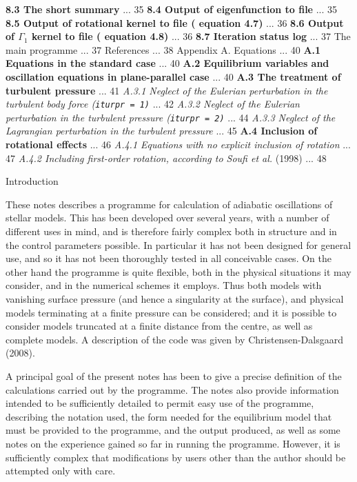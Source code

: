 {\bf 8.3 The short summary} ... 35
\mainsectcont
{\bf 8.4 Output of eigenfunction to file} ... 35
\mainsectcont
{\bf 8.5 Output of rotational kernel to file ({\cf} equation 4.7)} ... 36
\mainsectcont
{\bf 8.6 Output of $\Gamma_1$ kernel to file ({\cf} equation 4.8)} ... 36
\mainsectcont
{\bf 8.7 Iteration status log} ... 37
\chaptercont
{ The main programme}  ... 37
\chaptercont
{\twelvebf References} ... 38
\chaptercont
{\twelvebf Appendix A. Equations} ... 40
\mainsectcont
{\bf A.1 Equations in the standard case} ... 40
\mainsectcont
{\bf A.2 Equilibrium variables and oscillation equations in 
plane-parallel case} ... 40
\mainsectcont
{\bf A.3 The treatment of turbulent pressure} ... 41
\subsectcont
{\it A.3.1 Neglect of the Eulerian perturbation in the turbulent body force
({\tt iturpr = 1)}} ... 42
\subsectcont
{\it A.3.2 Neglect of the Eulerian perturbation in the turbulent pressure
({\tt iturpr = 2)}} ... 44
\subsectcont
{\it A.3.3 Neglect of the Lagrangian perturbation in the turbulent pressure}
... 45
\mainsectcont
{\bf A.4 Inclusion of rotational effects} ... 46
\subsectcont
{\it A.4.1 Equations with no explicit inclusion of rotation} ... 47
\subsectcont
{\it A.4.2 Including first-order rotation, according to Soufi et al.} (1998)
... 48
\newpage

\mainsect
\centerline{ Introduction} 

These notes describes a programme for calculation of adiabatic 
oscillations of stellar models. This has been developed over
several years, with a number of different uses in mind, and
is therefore fairly complex both in structure and in the
control parameters possible. In particular it has not been
designed for general use, and so it has not been thoroughly
tested in all conceivable cases. On the other hand the
programme is quite flexible, both in the physical situations
it may consider, and in the numerical schemes it employs.
Thus both models with vanishing surface pressure (and hence
a singularity at the surface), and physical models terminating
at a finite pressure can be considered; and it is possible to consider
models truncated at a finite distance from the centre, as well
as complete models.
A description of the code was given by Christensen-Dalsgaard (2008).

A principal goal of the present notes has been to give a precise
definition of the calculations carried out by the programme.
The notes also provide information intended to be sufficiently
detailed to permit easy use of the programme, describing
the notation used, the form needed for the equilibrium
model that must be provided to the programme, and the output
produced, as well as some notes on the experience gained so far
in running the programme. 
However, it is sufficiently complex 
that modifications by users other than the author should 
be attempted only with care.

